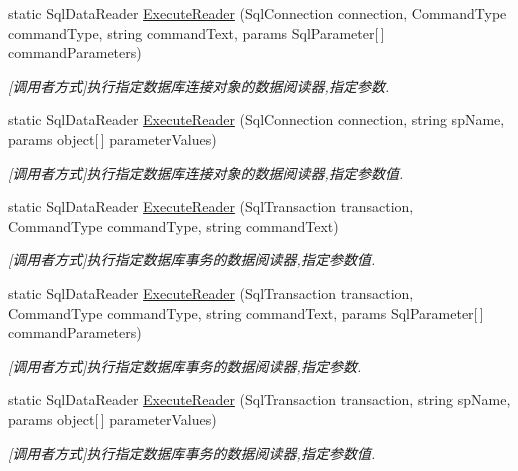 \begin{DoxyCompactItemize}
static Sql\-Data\-Reader \hyperlink{class_x_c_l_net_tools_1_1_data_base_1_1_m_s_s_q_l_1_1_sql_helper_a9e6aa775608f4e6cbf9c69d17ad97d4a}{Execute\-Reader} (Sql\-Connection connection, Command\-Type command\-Type, string command\-Text, params Sql\-Parameter\mbox{[}$\,$\mbox{]} command\-Parameters)
\begin{DoxyCompactList}\small\item\em \mbox{[}调用者方式\mbox{]}执行指定数据库连接对象的数据阅读器,指定参数. \end{DoxyCompactList}\item 
static Sql\-Data\-Reader \hyperlink{class_x_c_l_net_tools_1_1_data_base_1_1_m_s_s_q_l_1_1_sql_helper_a7a3f47f46b6c0ddcb97b6c8f0fb04474}{Execute\-Reader} (Sql\-Connection connection, string sp\-Name, params object\mbox{[}$\,$\mbox{]} parameter\-Values)
\begin{DoxyCompactList}\small\item\em \mbox{[}调用者方式\mbox{]}执行指定数据库连接对象的数据阅读器,指定参数值. \end{DoxyCompactList}\item 
static Sql\-Data\-Reader \hyperlink{class_x_c_l_net_tools_1_1_data_base_1_1_m_s_s_q_l_1_1_sql_helper_a6b4569da3e5c4d06dd91034f44fe259d}{Execute\-Reader} (Sql\-Transaction transaction, Command\-Type command\-Type, string command\-Text)
\begin{DoxyCompactList}\small\item\em \mbox{[}调用者方式\mbox{]}执行指定数据库事务的数据阅读器,指定参数值. \end{DoxyCompactList}\item 
static Sql\-Data\-Reader \hyperlink{class_x_c_l_net_tools_1_1_data_base_1_1_m_s_s_q_l_1_1_sql_helper_af9eb35d307bdf9d3e95b9c8843fe90b4}{Execute\-Reader} (Sql\-Transaction transaction, Command\-Type command\-Type, string command\-Text, params Sql\-Parameter\mbox{[}$\,$\mbox{]} command\-Parameters)
\begin{DoxyCompactList}\small\item\em \mbox{[}调用者方式\mbox{]}执行指定数据库事务的数据阅读器,指定参数. \end{DoxyCompactList}\item 
static Sql\-Data\-Reader \hyperlink{class_x_c_l_net_tools_1_1_data_base_1_1_m_s_s_q_l_1_1_sql_helper_a804fbff55febd149c51cbb0d5f1cd044}{Execute\-Reader} (Sql\-Transaction transaction, string sp\-Name, params object\mbox{[}$\,$\mbox{]} parameter\-Values)
\begin{DoxyCompactList}\small\item\em \mbox{[}调用者方式\mbox{]}执行指定数据库事务的数据阅读器,指定参数值. \end{DoxyCompactList}\item 

\end{DoxyCompactItemize}
